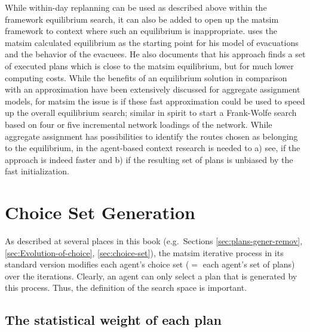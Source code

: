 While within-day replanning can be used as described above within the framework equilibrium search, it can also be added to open up the \gls{matsim} framework to context where such an equilibrium is inappropriate. 
%
\citet[][]{Dobler_PhDThesis_2013} uses the \gls{matsim} calculated equilibrium as the starting point for his model of evacuations and the behavior of the evacuees. 
He also documents that his approach finds a set of executed plans which is close to the \gls{matsim} equilibrium, but for much lower computing costs. 
While the benefits of an equilibrium solution in comparison with an approximation have been extensively discussed for aggregate assignment models, for \gls{matsim} the issue is if these fast approximation could be used to speed up the overall equilibrium search; similar in spirit to start a Frank-Wolfe search based on four or five incremental network loadings of the network.
While aggregate assignment has possibilities to identify the routes chosen as belonging to the equilibrium, in the agent-based context research is needed to a) see, if the approach is indeed faster and b) if the resulting set of plans is unbiased by the fast initialization. 

\section{Choice Set Generation}
\label{sec:choicesets}

As described at several places in this book (e.g.\ Sections
\ref{sec:plans-gener-remov}, 
\ref{sec:Evolution-of-choice},
\ref{sec:choice-set}), the \gls{matsim} iterative process in its standard version modifies each agent's choice set ($=$ each agent's set of plans) over the iterations.  
%
Clearly, an agent can only select a plan that is generated by this process.  Thus, the definition of the search space is important.

\subsection{The statistical weight of each plan}
\label{sec:stat-weight-of-plan}

